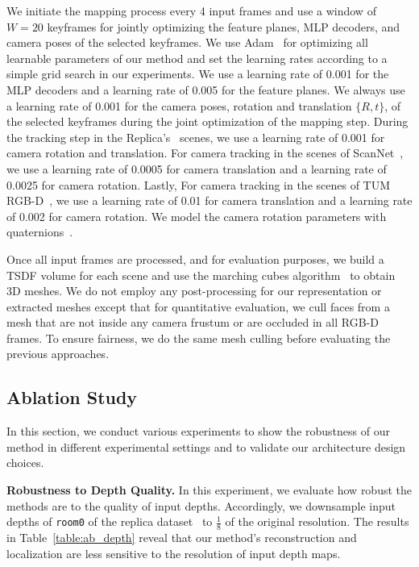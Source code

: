 We initiate the mapping process every 4 input frames and use a window of $W=20$ keyframes for jointly optimizing the feature planes, MLP decoders, and camera poses of the selected keyframes. We use Adam~\citep{adam} for optimizing all learnable parameters of our method and set the learning rates according to a simple grid search in our experiments. We use a learning rate of 0.001 for the MLP decoders and a learning rate of 0.005 for the feature planes. We always use a learning rate of 0.001 for the camera poses, \ie rotation and translation $\{R,t\}$, of the selected keyframes during the joint optimization of the mapping step. During the tracking step in the Replica's~\citep{replica19arxiv} scenes, we use a learning rate of 0.001 for camera rotation and translation. For camera tracking in the scenes of ScanNet~\citep{dai2017scannet}, we use a learning rate of 0.0005 for camera translation and a learning rate of 0.0025 for camera rotation. Lastly, For camera tracking in the scenes of TUM RGB-D~\citep{sturm2012benchmark}, we use a learning rate of 0.01 for camera translation and a learning rate of 0.002 for camera rotation. We model the camera rotation parameters with quaternions~\citep{shoemake1985animating}.

Once all input frames are processed, and for evaluation purposes, we build a TSDF volume for each scene and use the marching cubes algorithm~\citep{lorensen1987marching} to obtain 3D meshes. We do not employ any post-processing for our representation or extracted meshes except that for quantitative evaluation, we cull faces from a mesh that are not inside any camera frustum or are occluded in all RGB-D frames. To ensure fairness, we do the same mesh culling before evaluating the previous approaches.

\subsection{Ablation Study} \label{sec:c4_ablation}

In this section, we conduct various experiments to show the robustness of our method in different experimental settings and to validate our architecture design choices.

\vspace{1ex}
\noindent\textbf{Robustness to Depth Quality.} In this experiment, we evaluate how robust the methods are to the quality of input depths. Accordingly, we downsample input depths of \texttt{room0} of the replica dataset~\citep{replica19arxiv} to $\frac{1}{8}$ of the original resolution. The results in Table~\ref{table:ab_depth} reveal that our method's reconstruction and localization are less sensitive to the resolution of input depth maps.

